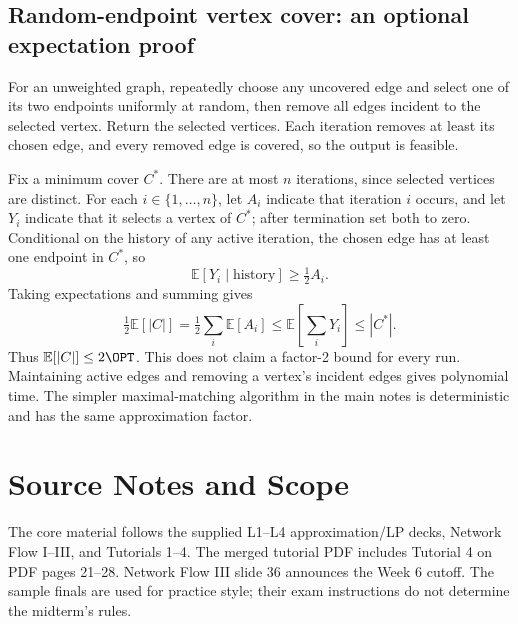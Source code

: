 \subsection{Random-endpoint vertex cover: an optional expectation proof}
\label{app:randomvc}
For an unweighted graph, repeatedly choose any uncovered edge and select one of its two
endpoints uniformly at random, then remove all edges incident to the selected vertex.
Return the selected vertices. Each iteration removes at least its chosen edge, and every
removed edge is covered, so the output is feasible.

Fix a minimum cover $C^*$. There are at most $n$ iterations, since selected vertices are
distinct. For each $i\in\{1,\ldots,n\}$, let $A_i$ indicate that iteration $i$ occurs,
and let $Y_i$ indicate that it selects a vertex of $C^*$; after termination set both to zero.
Conditional on the history of any active iteration, the chosen edge has at least one
endpoint in $C^*$, so
\[
\mathbb E[Y_i\mid\text{history}]\ge\tfrac12 A_i.
\]
Taking expectations and summing gives
\[
\tfrac12\mathbb E[|C|]=\tfrac12\sum_i\mathbb E[A_i]
\le\mathbb E\!\left[\sum_iY_i\right]\le |C^*|.
\]
Thus $\mathbb E[|C|]\le2\OPT$. This does not claim a factor-2 bound for every run.
Maintaining active edges and removing a vertex's incident edges gives polynomial time.
The simpler maximal-matching algorithm in the main notes is deterministic and has the
same approximation factor.

\section{Source Notes and Scope}
\label{app:sources}
The core material follows the supplied L1--L4 approximation/LP decks, Network Flow I--III,
and Tutorials 1--4. The merged tutorial PDF includes Tutorial 4 on PDF pages 21--28.
Network Flow III slide 36 announces the Week 6 cutoff. The sample finals are used for
practice style; their exam instructions do not determine the midterm's rules.

